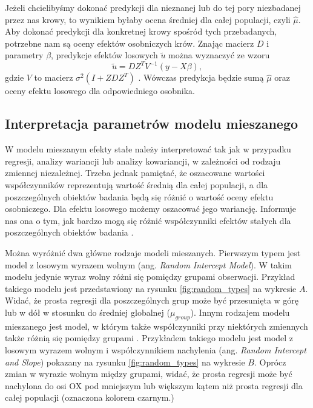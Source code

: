 \documentclass[12pt]{mwbk}
\theoremstyle{plain}
\theoremstyle{definition}
\theoremstyle{remark}
\begin{document}
Jeżeli chcielibyśmy dokonać predykcji dla nieznanej lub do tej pory niezbadanej przez nas krowy, to wynikiem byłaby ocena średniej dla całej populacji, czyli $\hat{\mu}$.
Aby dokonać predykcji dla konkretnej krowy spośród tych przebadanych, potrzebne nam są oceny efektów osobniczych krów.
Znając macierz $D$ i parametry $\beta$, predykcje efektów losowych $\widetilde{u}$ można wyznaczyć ze wzoru
$$\widetilde{u}=DZ^TV^{-1}(y-X\beta),$$
gdzie $V$ to macierz $\sigma^2(I+ZDZ^T)$ \cite{biecek}. Wówczas predykcja będzie sumą $\hat{\mu}$ oraz oceny efektu losowego dla odpowiedniego osobnika.

 
 
 
 
 \subsection{Interpretacja parametrów modelu mieszanego}
 W modelu mieszanym efekty stałe należy interpretować tak jak w przypadku regresji, analizy wariancji lub analizy kowariancji, w zależności od rodzaju zmiennej niezależnej. Trzeba jednak pamiętać, że oszacowane wartości współczynników reprezentują wartość średnią dla całej populacji, a dla poszczególnych obiektów badania będą się różnić o wartość oceny efektu osobniczego.
 Dla efektu losowego możemy oszacować jego wariancję. Informuje nas ona o tym, jak bardzo mogą się różnić współczynniki efektów stałych dla poszczególnych obiektów badania
 \cite{experimental}.
 
 Można wyróżnić dwa główne rodzaje modeli mieszanych. Pierwszym typem jest model z losowym wyrazem wolnym (ang. \textit{Random Intercept Model}). W takim modelu jedynie wyraz wolny różni się pomiędzy grupami obserwacji\cite{insurance}. Przykład takiego modelu jest przedstawiony na rysunku \ref{fig:random_types} na wykresie $A$. Widać, że prosta regresji dla poszczególnych grup może być przesunięta w górę lub w dół w stosunku do średniej globalnej ($\mu_{group}$). 
 Innym rodzajem modelu mieszanego jest model, w którym także współczynniki przy niektórych zmiennych także różnią się pomiędzy grupami \cite{insurance}. Przykładem takiego modelu jest model z losowym wyrazem wolnym i współczynnikiem nachylenia (ang. \textit{Random Intercept and Slope}) pokazany na rysunku \ref{fig:random_types} na wykresie $B$. Oprócz zmian w wyrazie wolnym między grupami, widać, że prosta regresji może być nachylona do osi OX pod mniejszym lub większym kątem niż prosta regresji dla całej populacji (oznaczona kolorem czarnym.)
 
\end{document}
